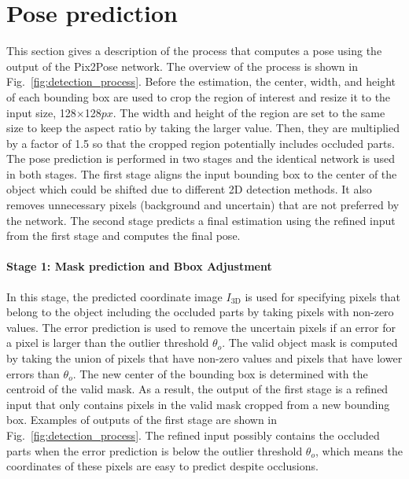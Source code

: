 \documentclass[10pt,twocolumn,letterpaper]{article}
\begin{document}
\section{Pose prediction} \label{poseprediction}
This section gives a description of the process that computes a pose using the output of the Pix2Pose network. The overview of the process is shown in Fig.~\ref{fig:detection_process}.
Before the estimation, the center, width, and height of each bounding box are used to crop the region of interest and resize it to the input size, 128$\times$128$px$. The width and height of the region are set to the same size to keep the aspect ratio by taking the larger value. Then, they are multiplied by a factor of 1.5 so that the cropped region potentially includes occluded parts. The pose prediction is performed in two stages and the identical network is used in both stages. The first stage aligns the input bounding box to the center of the object which could be shifted due to different 2D detection methods. It also removes unnecessary pixels (background and uncertain) that are not preferred by the network. The second stage predicts a final estimation using the refined input from the first stage and computes the final pose.


\paragraph{Stage 1: Mask prediction and Bbox Adjustment}
In this stage, the predicted coordinate image $I_\textrm{3D}$ is used for specifying pixels that belong to the object including the occluded parts by taking pixels with non-zero values. The error prediction is used to remove the uncertain pixels if an error for a pixel is larger than the outlier threshold $\theta_{o}$. The valid object mask is computed by taking the union of pixels that have non-zero values and pixels that have lower errors than $\theta_{o}$. The new center of the bounding box is determined with the centroid of the valid mask. As a result, the output of the first stage is a refined input that only contains pixels in the valid mask cropped from a new bounding box. Examples of outputs of the first stage are shown in Fig.~\ref{fig:detection_process}. The refined input possibly contains the occluded parts when the error prediction is below the outlier threshold $\theta_{o}$, which means the coordinates of these pixels are easy to predict despite occlusions. 
\end{document}
